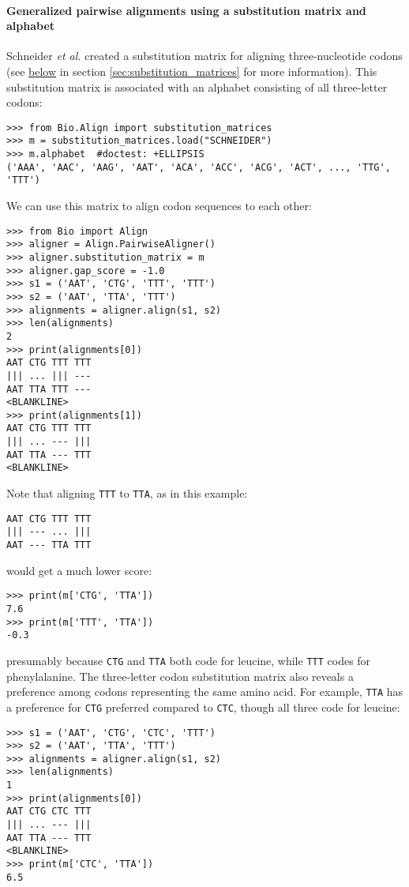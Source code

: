 \paragraph*{Generalized pairwise alignments using a substitution matrix and alphabet}

Schneider \textit{et al.} \cite{schneider2005} created a substitution matrix for aligning three-nucleotide codons (see \hyperlink{codonmatrix}{below} in section \ref{sec:substitution_matrices} for more information). This substitution matrix is associated with an alphabet consisting of all three-letter codons:

\begin{verbatim}
>>> from Bio.Align import substitution_matrices
>>> m = substitution_matrices.load("SCHNEIDER")
>>> m.alphabet  #doctest: +ELLIPSIS
('AAA', 'AAC', 'AAG', 'AAT', 'ACA', 'ACC', 'ACG', 'ACT', ..., 'TTG', 'TTT')
\end{verbatim}
We can use this matrix to align codon sequences to each other:

\begin{verbatim}
>>> from Bio import Align
>>> aligner = Align.PairwiseAligner()
>>> aligner.substitution_matrix = m
>>> aligner.gap_score = -1.0
>>> s1 = ('AAT', 'CTG', 'TTT', 'TTT')
>>> s2 = ('AAT', 'TTA', 'TTT')
>>> alignments = aligner.align(s1, s2)
>>> len(alignments)
2
>>> print(alignments[0])
AAT CTG TTT TTT
||| ... ||| ---
AAT TTA TTT ---
<BLANKLINE>
>>> print(alignments[1])
AAT CTG TTT TTT
||| ... --- |||
AAT TTA --- TTT
<BLANKLINE>
\end{verbatim}
Note that aligning \verb+TTT+ to \verb+TTA+, as in this example:
\begin{verbatim}
AAT CTG TTT TTT
||| --- ... |||
AAT --- TTA TTT
\end{verbatim}
would get a much lower score:

\begin{verbatim}
>>> print(m['CTG', 'TTA'])
7.6
>>> print(m['TTT', 'TTA'])
-0.3
\end{verbatim}
presumably because \verb+CTG+ and \verb+TTA+ both code for leucine, while \verb+TTT+ codes for phenylalanine. The three-letter codon substitution matrix also reveals a preference among codons representing the same amino acid. For example, \verb+TTA+ has a preference for \verb+CTG+ preferred compared to \verb+CTC+, though all three code for leucine:

\begin{verbatim}
>>> s1 = ('AAT', 'CTG', 'CTC', 'TTT')
>>> s2 = ('AAT', 'TTA', 'TTT')
>>> alignments = aligner.align(s1, s2)
>>> len(alignments)
1
>>> print(alignments[0])
AAT CTG CTC TTT
||| ... --- |||
AAT TTA --- TTT
<BLANKLINE>
>>> print(m['CTC', 'TTA'])
6.5
\end{verbatim}

